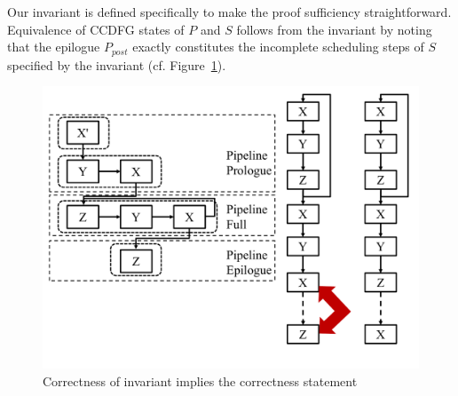Our invariant is defined specifically to make the proof
sufficiency straightforward.
Equivalence of CCDFG states of $P$ and $S$ follows from the
invariant by noting that the epilogue $P_{post}$ exactly
constitutes the incomplete scheduling steps of $S$ specified
by the invariant
(cf. Figure~\ref{fig:invariant-implies-correctness}).

\begin{figure}[t!]
\begin{center}
\includegraphics[width=5in]{fig-proposal/invariant-implies-correctness}
\end{center}
\caption{Correctness of invariant implies the correctness statement}
\label{fig:invariant-implies-correctness}
\end{figure}

